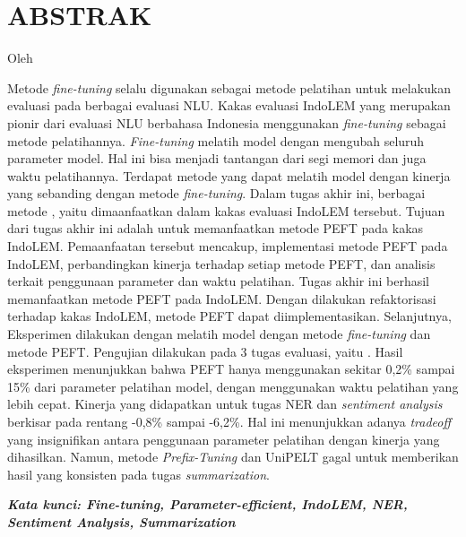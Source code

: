 \clearpage
\chapter*{ABSTRAK}

\begin{center}
    \center
    \begin{singlespace}
        \large\bfseries\MakeUppercase{\thetitle}
    
        \normalfont\normalsize
        Oleh
    
        \bfseries \theauthor
    \end{singlespace}
\end{center} 

\begin{singlespace}
    Metode \textit{fine-tuning} selalu digunakan sebagai metode pelatihan untuk melakukan evaluasi pada berbagai evaluasi NLU. Kakas evaluasi IndoLEM yang merupakan pionir dari evaluasi NLU berbahasa Indonesia menggunakan \textit{fine-tuning} sebagai metode pelatihannya. \textit{Fine-tuning} melatih model dengan mengubah seluruh parameter model. Hal ini bisa menjadi tantangan dari segi memori dan juga waktu pelatihannya. Terdapat metode \PEFT yang dapat melatih model dengan kinerja yang sebanding dengan metode \textit{fine-tuning}. Dalam tugas akhir ini, berbagai metode \PEFT, yaitu \methodPEFT dimaanfaatkan dalam kakas evaluasi IndoLEM tersebut. Tujuan dari tugas akhir ini adalah untuk memanfaatkan metode PEFT pada kakas IndoLEM. Pemaanfaatan tersebut mencakup, implementasi metode PEFT pada IndoLEM, perbandingkan kinerja terhadap setiap metode PEFT, dan analisis terkait penggunaan parameter dan waktu pelatihan.
    Tugas akhir ini berhasil memanfaatkan metode PEFT pada IndoLEM. Dengan dilakukan refaktorisasi terhadap kakas IndoLEM, metode PEFT dapat diimplementasikan. Selanjutnya, Eksperimen dilakukan dengan melatih model dengan metode \textit{fine-tuning} dan metode PEFT. Pengujian dilakukan pada 3 tugas evaluasi, yaitu \nlptask. Hasil eksperimen menunjukkan bahwa PEFT hanya menggunakan sekitar 0,2\% sampai 15\% dari parameter pelatihan model, dengan menggunakan waktu pelatihan yang lebih cepat. Kinerja yang didapatkan untuk tugas NER dan \textit{sentiment analysis} berkisar pada rentang -0,8\% sampai -6,2\%. Hal ini menunjukkan adanya \textit{tradeoff} yang insignifikan antara penggunaan parameter pelatihan dengan kinerja yang dihasilkan. Namun, metode \textit{Prefix-Tuning} dan UniPELT gagal untuk memberikan hasil yang konsisten pada tugas \textit{summarization}.

    \textit{\textbf{Kata kunci: Fine-tuning, Parameter-efficient, IndoLEM, NER, Sentiment Analysis, Summarization}}
\end{singlespace}

\clearpage
